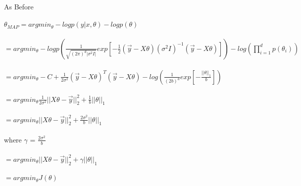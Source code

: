 \newcommand\tab[1][1cm]{\hspace*{#1}}
\begin{answer}
\\ \\
As Before \\ \\
\tab$\theta_{MAP} = argmin_\theta - logp(y|x,\theta) - logp(\theta)$ \\ \\
\tab[2cm]$= argmin_\theta - logp( \frac{1}{\sqrt{(2\pi)^d|\sigma^2I|}} exp [-\frac{1}{2}(\overrightarrow{y} - X\theta)(\sigma^2I)^{-1} (\overrightarrow{y} - X\theta)] ) - log(\prod_{i=1}^dp(\theta_i))$ \\ \\
\tab[2cm]$= argmin_\theta - C + \frac{1}{2\sigma^2}(\overrightarrow{y} - X\theta)^T(\overrightarrow{y} - X\theta) - log(\frac{1}{(2b)^d} exp [-\frac{||\theta||_1}{b}])$ \\ \\
\tab[2cm]$= argmin_\theta \frac{1}{2\sigma^2} || X\theta -  \overrightarrow{y} ||_2^2 + \frac{1}{b}||\theta||_1$\\ \\
\tab[2cm]$= argmin_\theta  || X\theta -  \overrightarrow{y} ||_2^2 + \frac{2\sigma^2}{b}||\theta||_1$\\ \\
where $\gamma$ = $\frac{2\sigma^2}{b}$ \\ \\
\tab[2cm]$= argmin_\theta  || X\theta -  \overrightarrow{y} ||_2^2 + \gamma||\theta||_1$\\ \\
\tab[2cm]$= argmin_\theta  J(\theta)$\\ \\
\end{answer}
